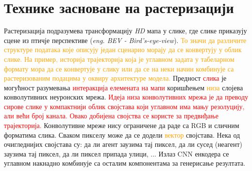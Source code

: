 \documentclass[11pt,oneside]{memoir}
\begin{document}
\section{Технике засноване на растеризацији}

Растеризација подразумева трансформацију \textit{HD} мапа у слике, где слике приказују сцене из птичје 
перспективе (\textit{eng. BEV - Bird's-eye-view}). \textcolor{orange}{То значи да различите структуре података које описују један сценарио 
морају да се конвертују у облик слике. На пример, историја трајекторија која је углавном задата у табеларном формату мора да се конвертује 
у слику или да се на неки начин комбинује са растеризованим подацима у оквиру архитектуре модела.}
Предност \textcolor{red}{слика} је могућност разумевања \textcolor{red}{интеракција елемената на мапи} 
коришћењем \textcolor{orange}{низа} слојева конволутивних неуронских мрежа.
\textcolor{red}{Идеја низа конволутивних мрежа је да преводу сирове слике у компактнији облик својстава који углавном има мању резолуцију, 
али већи број канала. Овако добијена својства се користе за предвиђање трајекторија.}
Конволутивне мреже нису ограничене да раде са RGB и сличним форматима слика. Сваком пикселу може да се додели \textcolor{orange}{вектор} својстава. 
Нека од очигледнијих својстава су: да ли агент заузима тај пиксел, да ли сусед (неагент) заузима тај пиксел,
да ли пиксел припада улици, ... Излаз CNN енкодера се углавном накнадно комбинује са осталим компонентама за генерисање резултата. 
\end{document}
